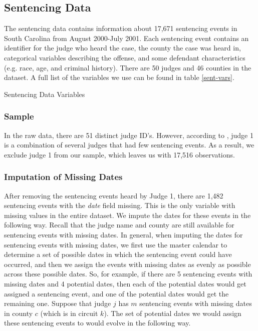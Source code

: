 \documentclass[11pt]{article}
\theoremstyle{ModifiedStyle}
\begin{document}
  \subsection{Sentencing Data}
    The sentencing data contains information about 17,671 sentencing events in South Carolina from August 2000-July 2001. Each sentencing event contains an identifier for the judge who heard the case, the county the case was heard in, categorical variables describing the offense, and some defendant characteristics (e.g. race, age, and criminal history). There are 50 judges and 46 counties in the dataset. A full list of the variables we use can be found in table \ref{sent-vars}.

    \begin{table}[H]
      \caption{Sentencing Data Variables}
      \label{sent-vars}
      
    \end{table}

    \subsubsection{Sample}
      In the raw data, there are 51 distinct judge ID's. However, according to \cite{hester2017conditional}, judge 1 is a combination of several judges that had few sentencing events. As a result, we exclude judge 1 from our sample, which leaves us with 17,516 observations.

    \subsubsection{Imputation of Missing Dates}
      After removing the sentencing events heard by Judge 1, there are 1,482 sentencing events with the \textit{date} field missing. This is the only variable with missing values in the entire dataset. We impute the dates for these events in the following way. Recall that the judge name and county are still available for sentencing events with missing dates. In general, when imputing the dates for sentencing events with missing dates, we first use the master calendar to determine a set of possible dates in which the sentencing event could have occurred, and then we assign the events with missing dates as evenly as possible across these possible dates. So, for example, if there are 5 sentencing events with missing dates and 4 potential dates, then each of the potential dates would get assigned a sentencing event, and one of the potential dates would get the remaining one.
      Suppose that judge $j$ has $m$ sentencing events with missing dates in county $c$ (which is in circuit $k$). The set of potential dates we would assign these sentencing events to would evolve in the following way.
\end{document}

